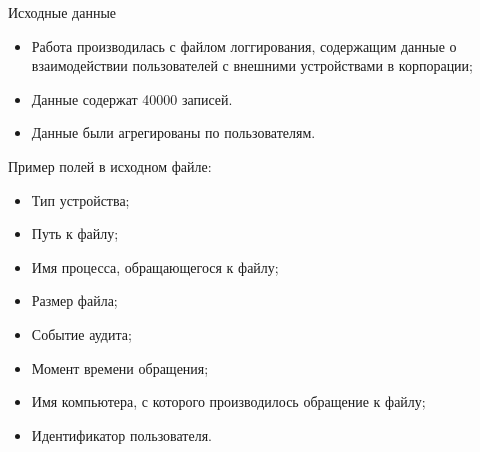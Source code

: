 \documentclass{beamer}
\begin{document}
\begin{frame}{Исходные данные}
    \begin{itemize}
        \item Работа производилась с файлом логгирования, содержащим данные о взаимодействии пользователей с внешними устройствами в корпорации;
        \item Данные содержат 40000 записей.
        \item Данные были агрегированы по пользователям.
    \end{itemize}

    Пример полей в исходном файле:
    \begin{multicols}{2}
        \begin{itemize}
            \item Тип устройства;
            \item Путь к файлу;
            \item Имя процесса, обращающегося к файлу;
            \item Размер файла;
            \item Событие аудита;
            \item Момент времени обращения;
            \item Имя компьютера, с которого производилось обращение к файлу;
            \item Идентификатор пользователя.
        \end{itemize}
    \end{multicols}
\end{frame}
\end{document}
